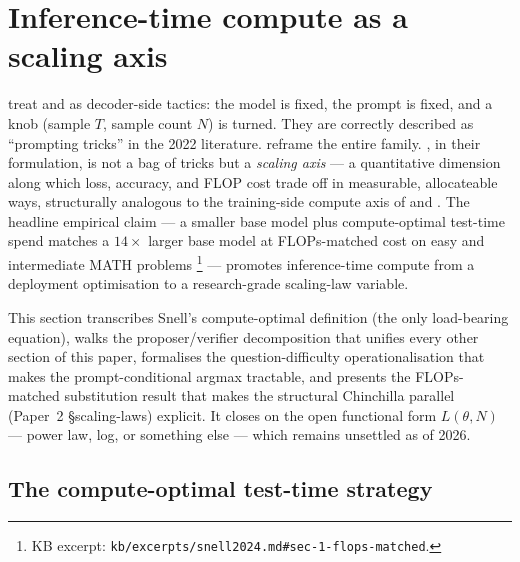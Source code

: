 
\section{Inference-time compute as a scaling axis}
\label{sec:inference-compute-scaling}
\label{sec:inference-compute-axis}
\label{sec:test-time-compute}

 treat  and
 as decoder-side tactics: the model is fixed, the prompt
is fixed, and a knob (sample $T$, sample count $N$) is turned. They are
correctly described as ``prompting tricks'' in the 2022 literature.
\citet{snell2024} reframe the entire family. , in
their formulation, is not a bag of tricks but a \emph{scaling axis} ---
a quantitative dimension along which loss, accuracy, and FLOP cost trade
off in measurable, allocateable ways, structurally analogous to the
training-side compute axis of \citet{kaplan2020} and
\citet{hoffmann2022-chinchilla}. The headline empirical claim --- a
smaller base model plus compute-optimal test-time spend matches a
$14\times$ larger base model at FLOPs-matched cost on easy and
intermediate MATH problems
\citep[\S 1, \S 6]{snell2024}\footnote{KB excerpt:
\texttt{kb/excerpts/snell2024.md\#sec-1-flops-matched}.} --- promotes
inference-time compute from a deployment optimisation to a research-grade
scaling-law variable.

This section transcribes Snell's compute-optimal definition (the only
load-bearing equation), walks the proposer/verifier decomposition that
unifies every other section of this paper, formalises the
question-difficulty operationalisation that makes the
prompt-conditional argmax tractable, and presents the FLOPs-matched
substitution result that makes the structural Chinchilla parallel
(Paper~2 \S scaling-laws) explicit. It closes on the open functional
form $L(\theta, N)$ --- power law, log, or something else --- which
remains unsettled as of 2026.

\subsection{The compute-optimal test-time strategy}
\label{sec:snell-compute-optimal}

